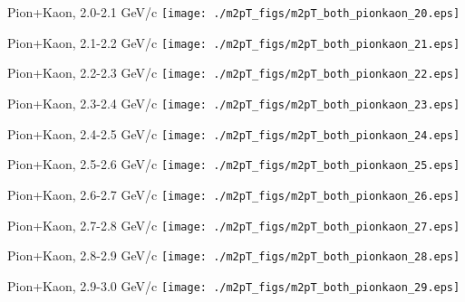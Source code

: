 \documentclass[compress]{beamer} %
\begin{document}
\begin{frame}{Pion+Kaon, 2.0-2.1 GeV/c}
\texttt{[image: ./m2pT\_figs/m2pT\_both\_pionkaon\_20.eps]}
\end{frame}
\begin{frame}{Pion+Kaon, 2.1-2.2 GeV/c}
\texttt{[image: ./m2pT\_figs/m2pT\_both\_pionkaon\_21.eps]}
\end{frame}
\begin{frame}{Pion+Kaon, 2.2-2.3 GeV/c}
\texttt{[image: ./m2pT\_figs/m2pT\_both\_pionkaon\_22.eps]}
\end{frame}
\begin{frame}{Pion+Kaon, 2.3-2.4 GeV/c}
\texttt{[image: ./m2pT\_figs/m2pT\_both\_pionkaon\_23.eps]}
\end{frame}
\begin{frame}{Pion+Kaon, 2.4-2.5 GeV/c}
\texttt{[image: ./m2pT\_figs/m2pT\_both\_pionkaon\_24.eps]}
\end{frame}
\begin{frame}{Pion+Kaon, 2.5-2.6 GeV/c}
\texttt{[image: ./m2pT\_figs/m2pT\_both\_pionkaon\_25.eps]}
\end{frame}
\begin{frame}{Pion+Kaon, 2.6-2.7 GeV/c}
\texttt{[image: ./m2pT\_figs/m2pT\_both\_pionkaon\_26.eps]}
\end{frame}
\begin{frame}{Pion+Kaon, 2.7-2.8 GeV/c}
\texttt{[image: ./m2pT\_figs/m2pT\_both\_pionkaon\_27.eps]}
\end{frame}
\begin{frame}{Pion+Kaon, 2.8-2.9 GeV/c}
\texttt{[image: ./m2pT\_figs/m2pT\_both\_pionkaon\_28.eps]}
\end{frame}
\begin{frame}{Pion+Kaon, 2.9-3.0 GeV/c}
\texttt{[image: ./m2pT\_figs/m2pT\_both\_pionkaon\_29.eps]}
\end{frame}
\end{document}
